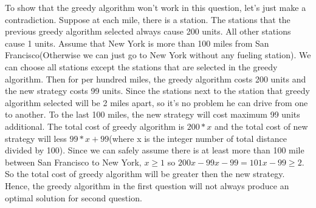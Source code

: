 \documentclass[11pt]{article}
\begin{document}
\begin{solution}
\begin{enumerate}
       To show that the greedy algorithm won't work in this question, let's just make a contradiction. Suppose at each mile, there is a station. The stations that the previous greedy algorithm selected always cause 200 units. All other stations cause 1 units. Assume that New York is more than 100 miles from San Francisco(Otherwise we can just go to New York without any fueling station). We can choose all stations except the stations that are selected in the greedy algorithm. Then for per hundred miles, the greedy algorithm costs 200 units and the new strategy costs 99 units. Since the stations next to the station that greedy algorithm selected will be 2 miles apart, so it's no problem he can drive from one to another. To the last 100 miles, the new strategy will cost maximum 99 units additional. The total cost of greedy algorithm is $200*x$ and the total cost of new strategy will less $99*x + 99$(where x is the integer number of total distance divided by 100). Since we can safely assume there is at least more than 100 mile between San Francisco to New York, $x\geq 1$ so $200x - 99x - 99 = 101x - 99 \geq 2$. So the total cost of greedy algorithm will be greater then the new strategy. Hence, the greedy algorithm in the first question will not always produce an optimal solution for second question. 
\end{enumerate}
\end{solution}
\end{document}
